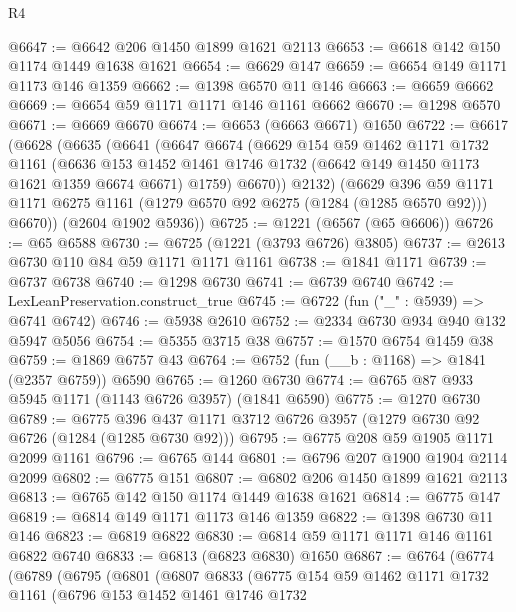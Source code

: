 \begin{lexlean}{R4}
\begin{coremodule}
@6647 := @6642 @206 @1450 @1899 @1621 @2113
@6653 := @6618 @142 @150 @1174 @1449 @1638 @1621
@6654 := @6629 @147
@6659 := @6654 @149 @1171 @1173 @146 @1359
@6662 := @1398 @6570 @11 @146
@6663 := @6659 @6662
@6669 := @6654 @59 @1171 @1171 @146 @1161 @6662
@6670 := @1298 @6570
@6671 := @6669 @6670
@6674 := @6653 (@6663 @6671) @1650
@6722 := @6617
    (@6628
      (@6635
        (@6641
          (@6647
            @6674
            (@6629
              @154
              @59
              @1462
              @1171
              @1732
              @1161
              (@6636
                @153
                @1452
                @1461
                @1746
                @1732
                (@6642 @149 @1450 @1173 @1621 @1359 @6674 @6671)
                @1759)
              @6670))
          @2132)
        (@6629
          @396
          @59
          @1171
          @1171
          @6275
          @1161
          (@1279 @6570 @92 @6275 (@1284 (@1285 @6570 @92)))
          @6670))
      (@2604 @1902 @5936))
@6725 := @1221 (@6567 (@65 @6606))
@6726 := @65 @6588
@6730 := @6725 (@1221 (@3793 @6726) @3805)
@6737 := @2613 @6730 @110 @84 @59 @1171 @1171 @1161
@6738 := @1841 @1171
@6739 := @6737 @6738
@6740 := @1298 @6730
@6741 := @6739 @6740
@6742 := LexLeanPreservation.construct_true
@6745 := @6722 (fun ("_" : @5939) => @6741 @6742)
@6746 := @5938 @2610
@6752 := @2334 @6730 @934 @940 @132 @5947 @5056
@6754 := @5355 @3715 @38
@6757 := @1570 @6754 @1459 @38
@6759 := @1869 @6757 @43
@6764 := @6752 (fun (__b : @1168) => @1841 (@2357 @6759)) @6590
@6765 := @1260 @6730
@6774 := @6765 @87 @933 @5945 @1171 (@1143 @6726 @3957) (@1841 @6590)
@6775 := @1270 @6730
@6789 := @6775 @396 @437 @1171 @3712 @6726 @3957 (@1279 @6730 @92 @6726 (@1284 (@1285 @6730 @92)))
@6795 := @6775 @208 @59 @1905 @1171 @2099 @1161
@6796 := @6765 @144
@6801 := @6796 @207 @1900 @1904 @2114 @2099
@6802 := @6775 @151
@6807 := @6802 @206 @1450 @1899 @1621 @2113
@6813 := @6765 @142 @150 @1174 @1449 @1638 @1621
@6814 := @6775 @147
@6819 := @6814 @149 @1171 @1173 @146 @1359
@6822 := @1398 @6730 @11 @146
@6823 := @6819 @6822
@6830 := @6814 @59 @1171 @1171 @146 @1161 @6822 @6740
@6833 := @6813 (@6823 @6830) @1650
@6867 := @6764
    (@6774
      (@6789
        (@6795
          (@6801
            (@6807
              @6833
              (@6775
                @154
                @59
                @1462
                @1171
                @1732
                @1161
                (@6796
                  @153
                  @1452
                  @1461
                  @1746
                  @1732

\end{coremodule}
\end{lexlean}
